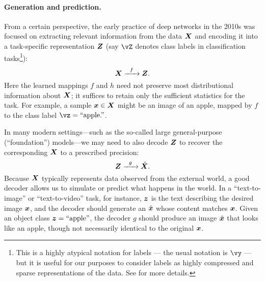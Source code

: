 \documentclass[../../book-main.tex]{subfiles}
\begin{document}
\paragraph{Generation and prediction.}
From a certain perspective, the early practice of deep networks in the 2010s was focused on extracting relevant information from the data $\bm{X}$ and encoding it into a task-specific representation $\bm{Z}$ (say $\vZ$ denotes class labels in classification tasks\footnote{This is a highly atypical notation for labels --- the usual notation is \(\vy\) --- but it is useful for our purposes to consider labels as highly compressed and sparse representations of the data. See  for more details.}):
\begin{equation}
    \bm{X}   \xrightarrow{\hspace{2mm} f \hspace{2mm}} \bm{Z}.
       \label{eqn:encoding-deep-networks}
\end{equation}
Here the learned mappings $f$ and $h$ need not preserve most distributional information about $\bm{X}$; it suffices to retain only the sufficient statistics for the task. For example, a sample $\bm{x}\in\bm{X}$ might be an image of an apple, mapped by $f$ to the class label $\vz=\text{``apple.''}$. 

In many modern settings---such as the so-called large general-purpose (``foundation'') models---we may need to also decode $\bm{Z}$ to recover the corresponding $\bm{X}$ to a prescribed precision:
\begin{equation}
    \bm{Z}   \xrightarrow{\hspace{2mm} g  \hspace{2mm}} \hat {\bm{X}}.
       \label{eqn:decoding-deep-networks}
\end{equation}
Because $\bm{X}$ typically represents data observed from the external world, a good decoder allows us to simulate or predict what happens in the world. In a ``text-to-image'' or ``text-to-video'' task, for instance, $\bm{z}$ is the text describing the desired image $\bm{x}$, and the decoder should generate an $\hat {\bm{x}}$ whose content matches $\bm{x}$. Given an object class $\bm{z}=\text{``apple''}$, the decoder $g$ should produce an image $\hat {\bm{x}}$ that looks like an apple, though not necessarily identical to the original $\bm{x}$.
\end{document}
